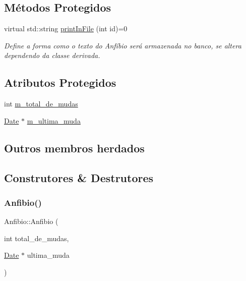 \subsection*{Métodos Protegidos}
\begin{DoxyCompactItemize}
\item 
virtual std\+::string \hyperlink{classAnfibio_ab866ca21fb00c2d4d571aadd271eadec}{print\+In\+File} (int id)=0
\begin{DoxyCompactList}\small\item\em Define a forma como o texto do Anfíbio será armazenada no banco, se altera dependendo da classe derivada. \end{DoxyCompactList}\end{DoxyCompactItemize}
\subsection*{Atributos Protegidos}
\begin{DoxyCompactItemize}
\item 
int \hyperlink{classAnfibio_a994200134b0d314e3db0ac5c781bb7e7}{m\+\_\+total\+\_\+de\+\_\+mudas}
\item 
\hyperlink{classDate}{Date} $\ast$ \hyperlink{classAnfibio_abc4969388066028d800dd134d3fc3ae9}{m\+\_\+ultima\+\_\+muda}
\end{DoxyCompactItemize}
\subsection*{Outros membros herdados}


\subsection{Construtores \& Destrutores}
\mbox{\label{classAnfibio_a488a2d9bfe450ebd8f0a19c5ec4eea32}} 
\subsubsection{\texorpdfstring{Anfibio()}{Anfibio()}\hspace{0.1cm}{\footnotesize\ttfamily [1/2]}}
{\footnotesize\ttfamily Anfibio\+::\+Anfibio (\begin{DoxyParamCaption}\item[{int}]{total\+\_\+de\+\_\+mudas,  }\item[{\hyperlink{classDate}{Date} $\ast$}]{ultima\+\_\+muda }\end{DoxyParamCaption})}



